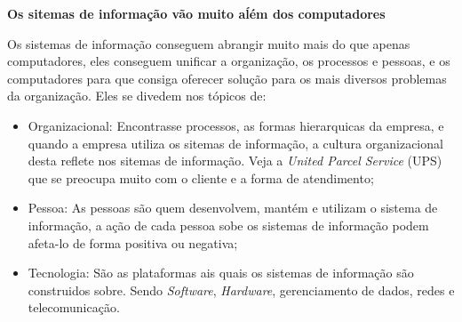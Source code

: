 \documentclass[
	12pt,				%
	openany,			%
	a4paper,			%
	chapter=TITLE,		%
	section=TITLE,		%
	english,
	brazil				%
]{abntex2}
\begin{document}
\textbf{Os sitemas de informação vão muito aĺém dos computadores}

Os sistemas de informação conseguem abrangir muito mais do que apenas computadores, eles conseguem unificar a organização, os processos e pessoas, e os computadores para que consiga oferecer solução para os mais diversos problemas da organização.
Eles se divedem nos tópicos de:
	\begin{itemize}
		\item Organizacional: Encontrasse processos, as formas hierarquicas da empresa, e quando a empresa utiliza os sitemas de informação, a cultura organizacional desta reflete nos sitemas de informação. Veja a \textit{United Parcel Service} (UPS) que se preocupa muito com o cliente e a forma de atendimento;
		\item Pessoa: As pessoas são quem desenvolvem, mantém e utilizam o sistema de informação, a ação de cada pessoa sobe os sistemas de informação podem afeta-lo de forma positiva ou negativa;
		\item Tecnologia: São as plataformas ais quais os sistemas de informação são construidos sobre. Sendo \textit{Software}, \textit{Hardware}, gerenciamento de dados, redes e telecomunicação.
	\end{itemize}
\end{document}
